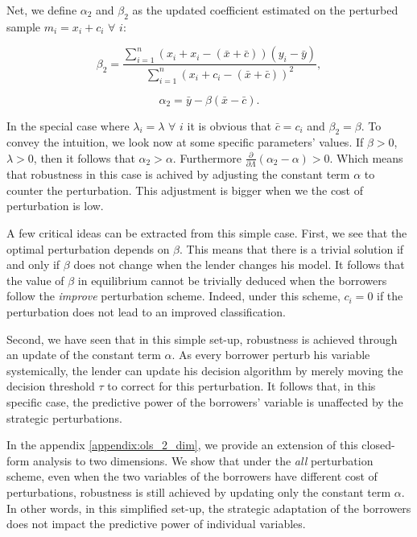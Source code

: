\documentclass[12pt]{article} %
\begin{document}
Net, we define $\alpha_2$ and $\beta_2$ as the updated coefficient estimated on the perturbed sample $m_i = x_i+c_i$ $\forall$ $i$:  

\begin{equation}
\beta_2=\frac{\sum_{i=1}^{n}\left(x_{i}+x_i-(\bar{x}+\bar{c})\right)\left(y_{i}-\bar{y}\right)}
{\sum_{i=1}^{n}\left(x_{i}+c_i-(\bar{x}+\bar{c})\right)^{2}},
\end{equation}

\begin{equation}
\alpha_2 = \bar{y}-\beta (\bar{x}-\bar{c}).
\end{equation}

In the special case where $\lambda_i=\lambda$ $\forall$ $i$ it is obvious that $\bar{c} = c_i$ and $\beta_2=\beta$. To convey the  intuition, we look now at some specific parameters' values. If $\beta>0$, $\lambda > 0$, then it follows that $\alpha_2>\alpha$. Furthermore $\frac{\partial}{\partial \Lambda}(\alpha_2-\alpha)>0$. Which means that robustness in this case is achived by adjusting the constant term $\alpha$ to counter the perturbation. This adjustment is bigger when we the cost of perturbation is low. 

A few critical ideas can be extracted from this simple case. First, we see that the optimal perturbation depends on $\beta$. This means that there is a trivial solution if and only if $\beta$ does not change when the lender changes his model. It follows that the value of $\beta$ in equilibrium cannot be trivially deduced when the borrowers follow the \textit{improve} perturbation scheme. Indeed, under this scheme, $c_i=0$ if the perturbation does not lead to an improved classification. 

Second, we have seen that in this simple set-up, robustness is achieved through an update of the constant term $\alpha$. As every borrower perturb his variable systemically, the lender can update his decision algorithm by merely moving the decision threshold $\tau$ to correct for this perturbation. It follows that, in this specific case, the predictive power of the borrowers' variable is unaffected by the strategic perturbations.

In the appendix \ref{appendix:ols_2_dim}, we provide an extension of this closed-form analysis to two dimensions. We show that under the \textit{all} perturbation scheme, even when the two variables of the borrowers have different cost of perturbations, robustness is still achieved by updating only the constant term $\alpha$. In other words, in this simplified set-up, the strategic adaptation of the borrowers does not impact the predictive power of individual variables. 
\end{document}
